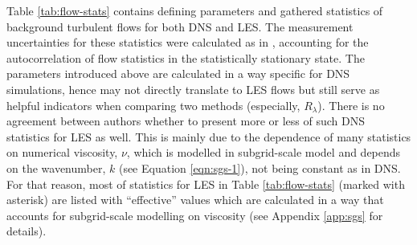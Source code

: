 \documentclass{pracamgren}
\begin{document}
Table \ref{tab:flow-stats} contains defining parameters and gathered statistics of background turbulent flows for both DNS and LES.
The measurement uncertainties for these statistics were calculated as in \textcite{Rosa2013}, accounting for the autocorrelation of flow statistics in the statistically stationary state.
The parameters introduced above are calculated in a way specific for DNS simulations, hence may not directly translate to LES flows but still serve as helpful indicators when comparing two methods (especially, $R_{\lambda}$).
There is no agreement between authors whether to present more \parencite{Rosa2017} or less \parencite{Yang2008} of such DNS statistics for LES as well.
This is mainly due to the dependence of many statistics on numerical viscosity, $\nu$, which is modelled in subgrid-scale model and depends on the wavenumber, $k$ (see Equation \ref{eqn:sgs-1}), not being constant as in DNS.
For that reason, most of statistics for LES in Table \ref{tab:flow-stats} (marked with asterisk) are listed with ``effective'' values which are calculated in a way that accounts for subgrid-scale modelling on viscosity (see Appendix \ref{app:sgs} for details). 
\end{document}
